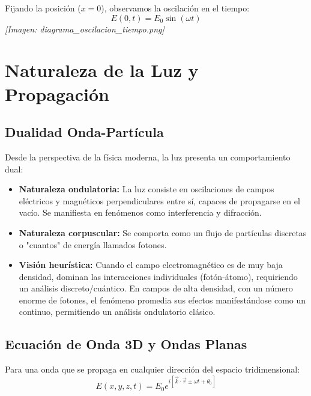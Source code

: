\documentclass[12pt]{article}
\begin{document}
	Fijando la posición ($x=0$), observamos la oscilación en el tiempo:
	\begin{equation*}
		E(0,t) = E_0 \sin(\omega t)
	\end{equation*}
	\textit{[Imagen: diagrama\_oscilacion\_tiempo.png]}
	
	\section{Naturaleza de la Luz y Propagación}
	
	\subsection{Dualidad Onda-Partícula}
	Desde la perspectiva de la física moderna, la luz presenta un comportamiento dual:
	\begin{itemize}
		\item \textbf{Naturaleza ondulatoria:} La luz consiste en oscilaciones de campos eléctricos y magnéticos perpendiculares entre sí, capaces de propagarse en el vacío. Se manifiesta en fenómenos como interferencia y difracción.
		\item \textbf{Naturaleza corpuscular:} Se comporta como un flujo de partículas discretas o "cuantos" de energía llamados fotones.
		\item \textbf{Visión heurística:} Cuando el campo electromagnético es de muy baja densidad, dominan las interacciones individuales (fotón-átomo), requiriendo un análisis discreto/cuántico. En campos de alta densidad, con un número enorme de fotones, el fenómeno promedia sus efectos manifestándose como un continuo, permitiendo un análisis ondulatorio clásico.
	\end{itemize}
	
	\subsection{Ecuación de Onda 3D y Ondas Planas}
	Para una onda que se propaga en cualquier dirección del espacio tridimensional:
	\begin{equation*}
		E(x,y,z,t) = E_0 e^{i[\vec{k}\cdot\vec{r} \pm \omega t + \theta_0]}
	\end{equation*}
	
	\begin{center}
	\end{center}
	
\end{document}
